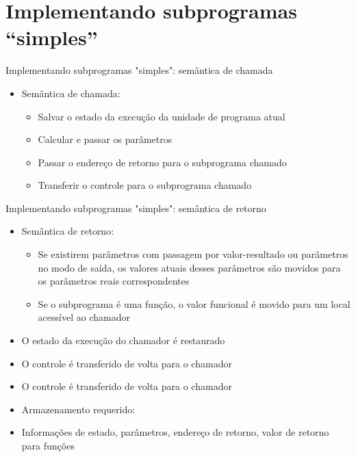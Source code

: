 \documentclass[10pt]{beamer}
\begin{document}
\section{Implementando subprogramas “simples”}

\begin{frame}[fragile]{Implementando subprogramas "simples": semântica de chamada}
    \begin{itemize}
        \item Semântica de chamada:
        \begin{itemize}
            \item Salvar o estado da execução da unidade de programa atual
			\item Calcular e passar os parâmetros
			\item Passar o endereço de retorno para o subprograma chamado
			\item Transferir o controle para o subprograma chamado
        \end{itemize}
    \end{itemize}
\end{frame}

\begin{frame}{Implementando subprogramas "simples": semântica de retorno}
	\begin{itemize}
	\item Semântica de retorno:
	\begin{itemize}
		\item Se existirem parâmetros com passagem por valor-resultado ou parâmetros no modo de saída, os valores atuais desses parâmetros são movidos para os parâmetros reais correspondentes
		\item Se o subprograma é uma função, o valor funcional é movido para um local acessível ao chamador
	\end{itemize}
	\item O estado da execução do chamador é restaurado
	\item O controle é transferido de volta para o chamador
	\item O controle é transferido de volta para o chamador
	\item Armazenamento requerido:
	\item Informações de estado, parâmetros, endereço de retorno, valor de retorno para funções
\end{itemize}
\end{frame}
\end{document}
